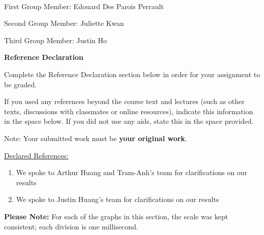 \documentclass[12pt,oneside]{article}
\begin{document}
\noindent
{}

\vspace{0.015in}\hrulefill\ \\
\large{First Group Member: Edouard Des Parois Perrault}
\par
\large{Second Group Member: Juliette Kwan}
\par
\large{Third Group Member: Justin Ho}
\\

\normalsize


\textbf{Reference Declaration}

Complete the Reference Declaration section below in order for your assignment to be graded.

If you used any references beyond the course text and lectures (such as other texts, discussions with classmates or online resources), indicate this information in the space below.  If you did not use any aids, state this in the space provided. 

Note: Your submitted work must be \textbf{your original work}. 

\underline{Declared References:} \\

\begin{enumerate}
    \item We spoke to Arthur Huang and Tram-Anh's team for clarifications on our
results
    \item We spoke to Justin Huang's team for clarifications on our results
\end{enumerate}

\newpage

\partone

\textbf{Please Note:} For each of the graphs in this section, the scale
was kept consistent; each division is one millisecond.
\end{document}
